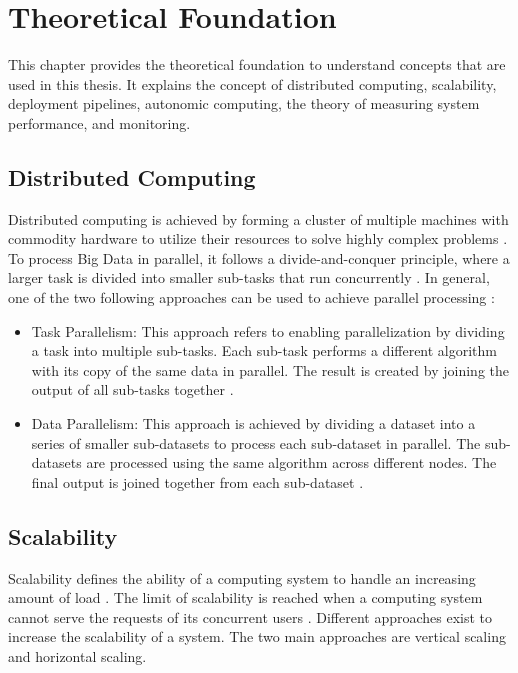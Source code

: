 \chapter{Theoretical Foundation}
\label{chap:02_foundation}


This chapter provides the theoretical foundation to understand concepts that are used in this thesis. It explains the concept of distributed computing, scalability, deployment pipelines, autonomic computing, the theory of measuring system performance, and monitoring.


\section{Distributed Computing}
Distributed computing is achieved by forming a cluster of multiple machines with commodity hardware to utilize their resources to solve highly complex problems \cite{Ganelin2016Spark}.
To process Big Data in parallel, it follows a divide-and-conquer principle, where a larger task is divided into smaller sub-tasks that run concurrently \cite{Khattak2016BigData}.
In general, one of the two following approaches can be used to achieve parallel processing \cite{Khattak2016BigData}:
\begin{itemize}
\item Task Parallelism:
This approach refers to enabling parallelization by dividing a task into multiple sub-tasks.
Each sub-task performs a different algorithm with its copy of the same data in parallel.
The result is created by joining the output of all sub-tasks together \cite{Khattak2016BigData}.

\item Data Parallelism:
This approach is achieved by dividing a dataset into a series of smaller sub-datasets to process each sub-dataset in parallel.
The sub-datasets are processed using the same algorithm across different nodes.
%
The final output is joined together from each sub-dataset \cite{Khattak2016BigData}.
\end{itemize}


\section{Scalability}
\label{sec:02_foundations_scalability}
Scalability defines the ability of a computing system to handle an increasing amount of load \cite{Farcic2017Toolkit21}. 
The limit of scalability is reached when a computing system cannot serve the requests of its concurrent users \cite{Wilder2012CloudPatterns}.
Different approaches exist to increase the scalability of a system. The two main approaches are vertical scaling and horizontal scaling.


